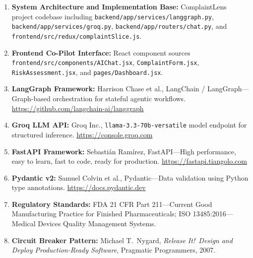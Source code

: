 \documentclass[12pt,a4paper]{report}
\begin{document}
\begin{enumerate}[leftmargin=*]
\item \textbf{System Architecture and Implementation Base:} ComplaintLens project codebase including \texttt{backend/\allowbreak app/\allowbreak services/\allowbreak langgraph.py}, \texttt{backend/\allowbreak app/\allowbreak services/\allowbreak groq.py}, \texttt{backend/\allowbreak app/\allowbreak routers/\allowbreak chat.py}, and \texttt{frontend/\allowbreak src/\allowbreak redux/\allowbreak complaintSlice.js}.

\item \textbf{Frontend Co-Pilot Interface:} React component sources \texttt{frontend/\allowbreak src/\allowbreak components/\allowbreak AIChat.jsx}, \texttt{ComplaintForm.jsx}, \texttt{RiskAssessment.jsx}, and \texttt{pages/\allowbreak Dashboard.jsx}.

\item \textbf{LangGraph Framework:} Harrison Chase et al., LangChain / LangGraph---Graph-based orchestration for stateful agentic workflows. \url{https://github.com/langchain-ai/langgraph}

\item \textbf{Groq LLM API:} Groq Inc., \texttt{llama-3.3-70b-versatile} model endpoint for structured inference. \url{https://console.groq.com}

\item \textbf{FastAPI Framework:} Sebasti\'{a}n Ram\'{i}rez, FastAPI---High performance, easy to learn, fast to code, ready for production. \url{https://fastapi.tiangolo.com}

\item \textbf{Pydantic v2:} Samuel Colvin et al., Pydantic---Data validation using Python type annotations. \url{https://docs.pydantic.dev}

\item \textbf{Regulatory Standards:} FDA 21 CFR Part 211---Current Good Manufacturing Practice for Finished Pharmaceuticals; ISO 13485:2016---Medical Devices Quality Management Systems.

\item \textbf{Circuit Breaker Pattern:} Michael T.\ Nygard, \textit{Release It!\ Design and Deploy Production-Ready Software}, Pragmatic Programmers, 2007.
\end{enumerate}
\end{document}
